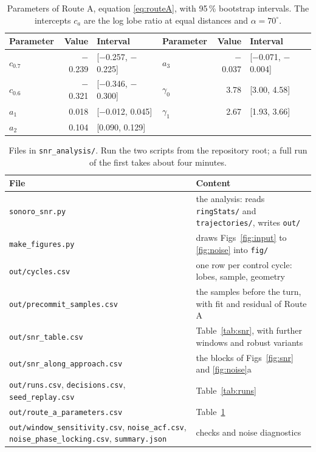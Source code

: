 \documentclass[11pt,a4paper]{article}
\newcommand{\code}[1]{\texttt{#1}}
\begin{document}
\begin{table}[H]
\centering\small
\caption{Parameters of Route A, equation \eqref{eq:routeA}, with 95\,\% bootstrap intervals. The intercepts
$c_a$ are the log lobe ratio at equal distances and $\alpha=70^\circ$.}
\label{tab:par}
\begin{tabular}{@{}l r l@{\qquad\qquad}l r l@{}}
\toprule
Parameter & Value & Interval & Parameter & Value & Interval\\
\midrule
$c_{0.7}$ & $-$0.239 & [$-$0.257, $-$0.225] & $a_3$ & $-$0.037 & [$-$0.071, $-$0.004]\\
$c_{0.6}$ & $-$0.321 & [$-$0.346, $-$0.300] & $\gamma_0$ & 3.78 & [3.00, 4.58]\\
$a_1$ & 0.018 & [$-$0.012, 0.045] & $\gamma_1$ & 2.67 & [1.93, 3.66]\\
$a_2$ & 0.104 & [0.090, 0.129] & & & \\
\bottomrule
\end{tabular}
\end{table}

\begin{table}[H]
\centering\small
\caption{Files in \code{snr\_analysis/}. Run the two scripts from the repository root; a full run of the first
takes about four minutes.}
\label{tab:files}
\begin{tabular}{@{}>{\raggedright\arraybackslash}p{}>{\raggedright\arraybackslash}p{}@{}}
\toprule
File & Content\\
\midrule
\code{sonoro\_snr.py} & the analysis: reads \code{ringStats/} and \code{trajectories/}, writes \code{out/}\\
\code{make\_figures.py} & draws Figs~\ref{fig:input} to \ref{fig:noise} into \code{fig/}\\
\code{out/cycles.csv} & one row per control cycle: lobes, sample, geometry\\
\code{out/precommit\_samples.csv} & the samples before the turn, with fit and residual of Route A\\
\code{out/snr\_table.csv} & Table~\ref{tab:snr}, with further windows and robust variants\\
\code{out/snr\_along\_approach.csv} & the blocks of Figs~\ref{fig:snr} and \ref{fig:noise}a\\
\code{out/runs.csv}, \code{decisions.csv}, \code{seed\_replay.csv} & Table~\ref{tab:runs}\\
\code{out/route\_a\_parameters.csv} & Table~\ref{tab:par}\\
\code{out/window\_sensitivity.csv}, \code{noise\_acf.csv}, \code{noise\_phase\_locking.csv}, \code{summary.json} & checks and noise diagnostics\\
\bottomrule
\end{tabular}
\end{table}
\end{document}
